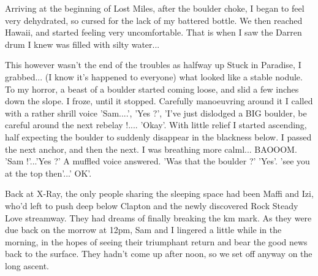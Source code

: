 Arriving at the beginning of Lost Miles, after the boulder choke, I began to feel very dehydrated, so cursed for the lack of my battered bottle. We then reached Hawaii, and started feeling very uncomfortable. That is when I saw the Darren drum I knew was filled with silty water...

This however wasn't the end of the troubles as halfway up Stuck in Paradise, I grabbed... (I know it's happened to everyone) what looked like a stable nodule. To my horror, a beast of a boulder started coming loose, and slid a few inches down the slope. I froze, until it stopped. Carefully manoeuvring around it I called with a rather shrill voice 'Sam....', 'Yes ?', 'I've just dislodged a BIG boulder, be careful around the next rebelay !.... 'Okay'. With little relief I started ascending, half expecting the boulder to suddenly disappear in the blackness below. I passed the next anchor, and then the next. I was breathing more calml... BAOOOM.
'Sam !'...'Yes ?' A muffled voice answered. 'Was that the boulder ?' 'Yes'. 'see you at the top then'...' OK'.

Back at X-Ray, the only people sharing the sleeping space had been Maffi and Izi, who'd left to push deep below Clapton and the newly discovered Rock Steady Love streamway. They had dreams of finally breaking the km mark. As they were due back on the morrow at 12pm, Sam and I lingered a little while in the morning, in the hopes of seeing their triumphant return and bear the good news back to the surface. They hadn't come up after noon, so we set off anyway on the long ascent. 

\begin{figure}[b!]
\end{figure}

